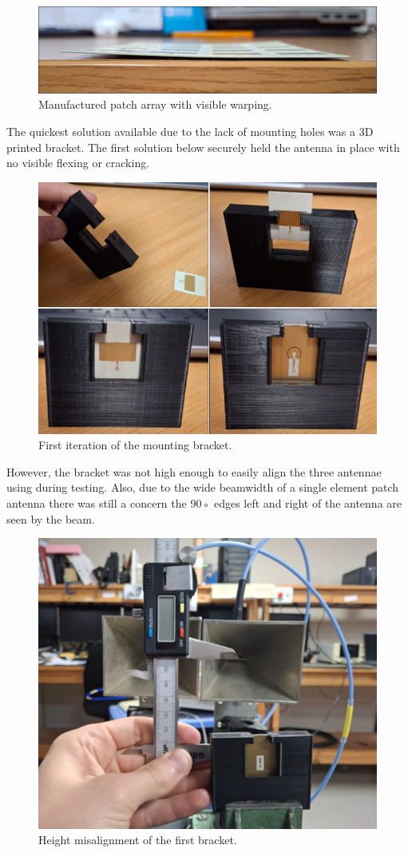     \begin{figure}[H]
    \centering
    \includegraphics[width=0.8\linewidth]{Figures/chp3_physical_warp.png}
    \caption{Manufactured patch array with visible warping.}
    \label{fig:chp3_physical_warp}
    \end{figure}

The quickest solution available due to the lack of mounting holes was a 3D printed bracket. The first solution below securely held the antenna in place with no visible flexing or cracking.

    \begin{figure}[H]
    \centering
    \includegraphics[width=0.4\linewidth]{Figures/chp3_failed_bracket.png}
    \caption{First iteration of the mounting bracket.}
    \label{fig:chp3_failed_bracket}
    \end{figure}
    
However, the bracket was not high enough to easily align the three antennae using during testing. Also, due to the wide beamwidth of a single element patch antenna there was still a concern the 90◦ edges left and right of the antenna are seen by the beam.

    \begin{figure}[H]
    \centering
    \includegraphics[width=0.3\linewidth]{Figures/chp3_failed_bracket_height.png}
    \caption{Height misalignment of the first bracket.}
    \label{fig:chp3_failed_bracket_height}
    \end{figure}

